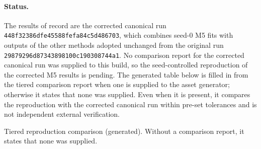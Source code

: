 \documentclass[11pt]{article}
\newcommand{\gentable}[1]{\begin{adjustbox}{max width=\textwidth,max totalheight=0.82\textheight}\end{adjustbox}}
\newcommand{\runid}{\nolinkurl{448f32386dfe45588fefa84c5d486703}}
\newcommand{\origrunid}{\nolinkurl{29879296d87343898100c190308744a1}}
\newif\ifctreport
\newcommand{\Reprostatus}{\ifctreport A seed-controlled reproduction of the corrected M5 results was run and compared with the corrected canonical run by the repository's tiered comparison; that internal comparison reports overall status ``\ctres{comparison}{report}{overall}''. This is an internal tolerance comparison by the same pipeline, not independent verification\else No comparison report for the corrected canonical run was supplied to this build, so the seed-controlled reproduction of the corrected M5 results is pending\fi}
\begin{document}
\paragraph{Status.} The results of record are the corrected canonical run \runid, which combines seed-0 M5 fits with outputs of the other methods adopted unchanged from the original run \origrunid. \Reprostatus. The generated table below is filled in from the tiered comparison report when one is supplied to the asset generator; otherwise it states that none was supplied. Even when it is present, it compares the reproduction with the corrected canonical run within pre-set tolerances and is not independent external verification.

\begin{table}[H]
\centering
\caption{Tiered reproduction comparison (generated). Without a comparison report, it states that none was supplied.}
\label{tab:repro}
\gentable{table_reproduction.tex}
\end{table}
\end{document}
